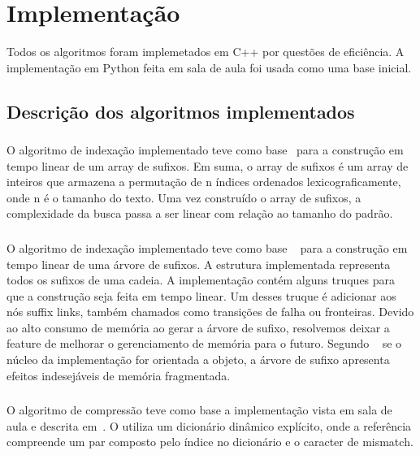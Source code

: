 \section{Implementação}
Todos os algoritmos foram implemetados em C++ por questões de eficiência. A
implementação em Python feita em sala de aula foi usada como uma base inicial.

\subsection{Descrição dos algoritmos implementados}

\subsubsection{\lsa}
O algoritmo de indexação  implementado teve como
base~\cite{KarkkainenS03} para a construção em
tempo linear de um array de sufixos. Em suma, o array de sufixos é um array de
inteiros que armazena a permutação de n índices ordenados lexicograficamente,
onde n é o tamanho do texto. Uma vez construído o array de sufixos, a
complexidade da busca passa a ser linear com relação ao tamanho do padrão.

\subsubsection{\lst}
O algoritmo de indexação implementado teve como
base ~\cite{UkkonenST} para a construção em tempo linear
de uma árvore de sufixos. A estrutura implementada representa
todos os sufixos de uma cadeia. A implementação contém alguns truques
para que a construção seja feita em tempo linear. Um desses truque é adicionar aos
nós suffix links, também chamados como transições de falha ou fronteiras. Devido 
ao alto consumo de memória ao gerar a árvore de sufixo, resolvemos deixar a feature
de melhorar o gerenciamento de memória para o futuro. Segundo ~\cite{BogdanCraig} se o núcleo 
da implementação for orientada a objeto, a árvore de sufixo apresenta efeitos indesejáveis
de memória fragmentada.

\subsubsection{\lz}

O algoritmo de compressão \lz teve como base a implementação vista em sala de
aula e descrita em~\cite{Storer:1987:DCM:42791}. O \lz utiliza um dicionário
dinâmico explícito, onde a referência compreende um par composto pelo índice no
dicionário e o caracter de mismatch.

